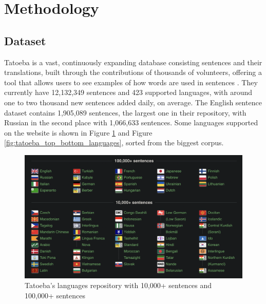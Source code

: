 \documentclass[a4paper]{article}
\begin{document}
\section{Methodology}

\subsection{Dataset}

Tatoeba is a vast, continuously expanding database consisting sentences and their translations, built through the contributions of thousands of volunteers, offering a tool that allows users to see examples of how words are used in sentences \cite{tatoeba}. They currently have 12,132,349 sentences and 423 supported languages, with around one to two thousand new sentences added daily, on average. The English sentence dataset contains 1,905,089 sentences, the largest one in their repository, with Russian in the second place with 1,066,633 sentences. Some languages supported on the website is shown in Figure \ref{fig:tatoeba_languages} and Figure \ref{fig:tatoeba_top_bottom_languages}, sorted from the biggest corpus.

\begin{figure}[htbp]
    \centering
    \includegraphics[width=0.9\linewidth]{images/tatoeba_languages.png}
    \caption{Tatoeba's languages repository with 10,000+ sentences and 100,000+ sentences \cite{tatoeba}}
    \label{fig:tatoeba_languages}
\end{figure}
\end{document}
